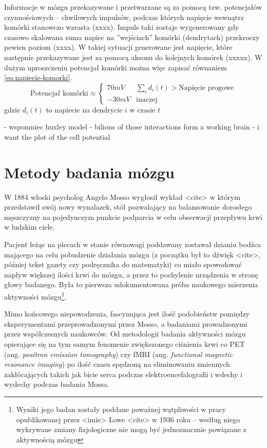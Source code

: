 \documentclass{./assets/wfis}
\begin{document}
Informacje w mózgu przekazywane i przetwarzane są za pomocą tzw. potencjałów czynnościowych – chwilowych impulsów, podczas których napięcie wewnątrz komórki stanowczo wzrasta (xxxx). Impuls taki zostaje wygenerowany gdy czasowo skalowana suma napiec na ''wejściach'' komórki (dendrytach) przekroczy pewien poziom (xxxx). W takiej sytuacji generowane jest napięcie, które następnie przekazywane jest za pomocą aksonu do kolejnych komórek (xxxxx). W dużym uproszczeniu potencjał komórki można więc zapisać równaniem \ref{eq:napiecie-komorki}.
\begin{equation}\label{eq:napiecie-komorki}
    \text{Potencjał komórki} \approx 
    \begin{cases} 
      70mV & \sum_i d_i(t) > \text{Napięcie progowe}  \\
      -30mV &  \text{inaczej}
   \end{cases}
\end{equation}
gdzie $d_i(t)$ to napiecie na dendrycie $i$ w czasie $t$

- wspomniec huxley model
- bilions of those interactions form a working brain
- i want the plot of the cell potential

\section{Metody badania mózgu}
W 1884 włoski psycholog Angelo Mosso wygłosił wykład <cite> w którym przedstawił swój nowy wynalazek, stół pozwalający na balansowanie dorosłego męszczyzny na pojedynczym punkcie podparcia w celu obserwacji przepływu krwi w ludzkim ciele. 

Pacjent leżąc na plecach w stanie równowagi poddawany zostawał dzianiu bodźca mającego na celu pobudzenie działania mózgu (z początku był to dźwięk <cite>, później tekst gazety czy podręcznika do matematyki) co miało spowodować napływ większej ilości krwi do mózgu, a przez to pochylenie urządzenia w stronę głowy badanego. Była to pierwsza udokumentowana próba naukowego mierzenia aktywności mózgu\footnote{Wyniki jego badan zostały poddane poważnej wątpliwości w pracy opublikowanej przez <imie> Lowe <cite> w 1936 roku – według niego wykrywane zmiany fizjologiczne nie mogą być jednoznacznie powiązane z aktywnością mózgu}.

Mimo końcowego niepowodzenia, fascynująca jest ilość podobieństw pomiędzy eksperymentami przeprowadzonymi przez Mosso, a badaniami prowadzonymi przez współczesnych naukowców. Od metodologii badania aktywności mózgu opierające się na tym samym fenomenie zwiększonego ciśnienia krwi co PET (ang. \textit{positron emission tomography}) czy fMRI (ang. \textit{functional magnetic resonance imaging}) po ilość czasu spędzoną na eliminowaniu zmiennych zakłócających takich jak bicie serca podczas elektroencefalografii i wdechy i wydechy podczas badania Mossa.
\end{document}
